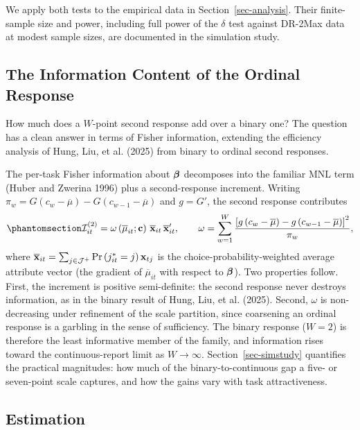 \documentclass[
  letterpaper,
  DIV=11,
  numbers=noendperiod]{scrartcl}
\theoremstyle{plain}
\theoremstyle{plain}
\theoremstyle{remark}
\begin{document}
We apply both tests to the empirical data in Section~\ref{sec-analysis}.
Their finite-sample size and power, including full power of the
\(\delta\) test against DR-2Max data at modest sample sizes, are
documented in the simulation study.

\subsection{The Information Content of the Ordinal
Response}\label{sec-information}

How much does a \(W\)-point second response add over a binary one? The
question has a clean answer in terms of Fisher information, extending
the efficiency analysis of Hung, Liu, et al. (2025) from binary to
ordinal second responses.

The per-task Fisher information about \(\boldsymbol{\beta}\) decomposes into the
familiar MNL term (Huber and Zwerina 1996) plus a second-response
increment. Writing
\(\pi_w = G(c_w - \overline{\mu}) - G(c_{w-1} - \overline{\mu})\) and
\(g = G'\), the second response contributes
\begin{equation}\protect\phantomsection\label{eq-fisher}{
\mathcal{I}^{(2)}_{it}
= \omega \left( \overline{\mu}_{it}; \mathbf{c} \right) \, \overline{\x}_{it} \, \overline{\x}_{it}',
\qquad
\omega = \sum_{w=1}^{W} \frac{ \left[ g \left( c_w - \overline{\mu} \right) - g \left( c_{w-1} - \overline{\mu} \right) \right]^2 }{ \pi_w },
}\end{equation} where
\(\overline{\mathbf{x}}_{it} = \sum_{j \in \mathcal{J}^+} \Pr\left(j^*_{it}=j\right) \mathbf{x}_{tj}\)
is the choice-probability-weighted average attribute vector (the
gradient of \(\overline{\mu}_{it}\) with respect to \(\boldsymbol{\beta}\)). Two
properties follow. First, the increment is positive semi-definite: the
second response never destroys information, as in the binary result of
Hung, Liu, et al. (2025). Second, \(\omega\) is non-decreasing under
refinement of the scale partition, since coarsening an ordinal response
is a garbling in the sense of sufficiency. The binary response (\(W=2\))
is therefore the least informative member of the family, and information
rises toward the continuous-report limit as \(W \to \infty\).
Section~\ref{sec-simstudy} quantifies the practical magnitudes: how much
of the binary-to-continuous gap a five- or seven-point scale captures,
and how the gains vary with task attractiveness.

\subsection{Estimation}\label{sec-estimation}
\end{document}
